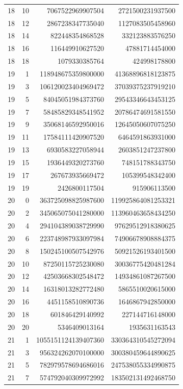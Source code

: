 \begin{longtable}{@{}rrrr@{}}
18 & 10 & 7067522969907504 & 2721500231937500\\
18 & 12 & 2867238347735040 & 1127083505458960\\
18 & 14 & 822448354868528 & 332123883576250\\
18 & 16 & 116449910627520 & 47881714454000\\
18 & 18 & 1079330385764 & 424998178800\\
19 & 1 & 118948675359800000 & 41368896818123875\\
19 & 3 & 106120023404969472 & 37039375237919210\\
19 & 5 & 84045051984373760 & 29543346643453125\\
19 & 7 & 58485829348541952 & 20786474691581550\\
19 & 9 & 35068146592950016 & 12645050607075250\\
19 & 11 & 17584111420907520 & 6464591863931000\\
19 & 13 & 6930583227058944 & 2603851247237800\\
19 & 15 & 1936449320273760 & 748151788343750\\
19 & 17 & 267673935669472 & 105399548342400\\
19 & 19 & 2426800117504 & 915906113500\\
20 & 0 & 363725098825987600 & 119925864081253321\\
20 & 2 & 345065075041280000 & 113960463658434250\\
20 & 4 & 294104389038729990 & 97629512918380625\\
20 & 6 & 223748987933097984 & 74906678908884375\\
20 & 8 & 150245100507542976 & 50921526193401500\\
20 & 10 & 87250115725230080 & 30036775420481284\\
20 & 12 & 42503668302548472 & 14934861087267500\\
20 & 14 & 16318013282772480 & 5865510020615000\\
20 & 16 & 4451158510890736 & 1646867942850000\\
20 & 18 & 601846429140992 & 227144716148000\\
20 & 20 & 5346409013164 & 1935631163543\\
21 & 1 & 1055151124139407360 & 330364310545272094\\
21 & 3 & 956324262070100000 & 300380459644890625\\
21 & 5 & 782979578694686016 & 247538055334990875\\
21 & 7 & 574792040309972992 & 183502131492468750\\

\end{longtable}
